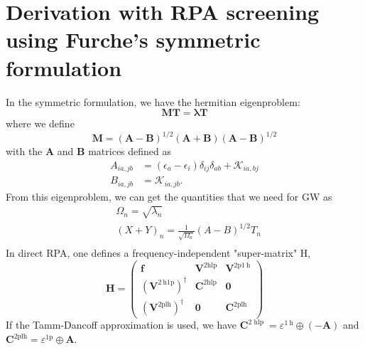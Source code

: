 \section{Derivation with RPA screening using Furche's symmetric formulation}
\label{sec:berk_gw}
In the symmetric formulation, we have the hermitian eigenproblem:
\begin{equation}
    \bm{M}\bm{T}= \bm{\lambda } \bm{T}
\label{eq:berk_gw_eigenproblem}
\end{equation}
where we define
\begin{equation}
    \bm{M}=(\bm{A}-\bm{B})^{1 / 2}(\bm{A}+\bm{B})(\bm{A}-\bm{B})^{1 / 2}
\end{equation}
with the $\bm{A}$ and $\bm{B}$ matrices defined as
\begin{align}
    A_{i a, j b} &= \left(\epsilon_a-\epsilon_i\right) \delta_{i j} \delta_{a b}+\mathcal{K}_{i a, b j} \\
    B_{i a, j b} &= \mathcal{K}_{i a, j b}.
\end{align}
From this eigenproblem, we can get the quantities that we need for GW as
\begin{equation}
    \begin{aligned}
& \Omega_n=\sqrt{\lambda_n} \\
& (X+Y)_n=\frac{1}{\sqrt{\Omega_n}}(A-B)^{1 / 2} T_n \\
\end{aligned}
\end{equation}
In direct RPA, one defines a frequency-independent "super-matrix" H,
$$
\mathbf{H}=\left(\begin{array}{ccc}
\mathbf{f} & \mathbf{V}^{2 \mathrm{hlp}} & \mathbf{V}^{2 \mathrm{p} 1 \mathrm{~h}} \\
\left(\mathbf{V}^{2 \mathrm{~h} 1 \mathrm{p}}\right)^{\dagger} & \mathbf{C}^{2 \mathrm{hlp}} & \mathbf{0} \\
\left(\mathbf{V}^{2 \mathrm{plh}}\right)^{\dagger} & \mathbf{0} & \mathbf{C}^{2 \mathrm{plh}}
\end{array}\right)
$$
If the Tamm-Dancoff approximation is used, we have $\mathbf{C}^{2 \text { hlp }}=\varepsilon^{1 \mathrm{~h}} \oplus(-\mathbf{A})$ and $\mathbf{C}^{2 \mathrm{plh}}=\varepsilon^{1 \mathrm{p}} \oplus \mathbf{A}$. 

